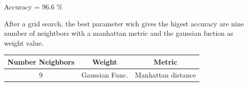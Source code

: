 \documentclass[11pt]{article}
\theoremstyle{plain}
\begin{document}
\begin{center}
Accuracy = 96.6 \%
\end{center}

After a grid search, the best parameter wich gives the higest accuracy are nine number of neightbors with a manhattan metric and the gaussian fuction as weight value.

\begin{center}
 \begin{tabular}{||c c c||} 
 \hline
  Number Neighbors & Weight &  Metric\\ [0.3ex] 
 \hline\hline
 9  &  Gaussian Func. &   Manhattan distance \\ 
 \hline

\end{tabular}
\end{center}
\end{document}
